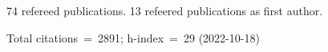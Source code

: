 74 refereed publications. 13 refeered publications as first author.

Total citations~=~2891; h-index~=~29 (2022-10-18)